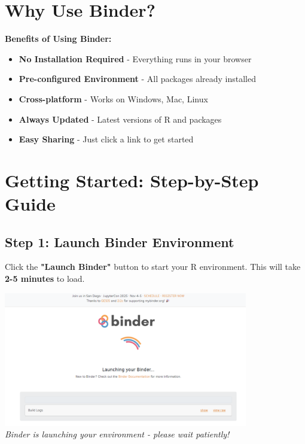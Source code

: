 \documentclass[11pt,a4paper]{article}
\begin{document}
\section{Why Use Binder?}

\begin{infobox}
\textbf{Benefits of Using Binder:}
\begin{itemize}[leftmargin=*]
    \item \textbf{No Installation Required} - Everything runs in your browser
    \item \textbf{Pre-configured Environment} - All packages already installed
    \item \textbf{Cross-platform} - Works on Windows, Mac, Linux
    \item \textbf{Always Updated} - Latest versions of R and packages
    \item \textbf{Easy Sharing} - Just click a link to get started
\end{itemize}
\end{infobox}

\section{Getting Started: Step-by-Step Guide}

\subsection{Step 1: Launch Binder Environment}

Click the \textbf{"Launch Binder"} button to start your R environment. This will take \textbf{2-5 minutes} to load.

\begin{center}
\includegraphics[width=0.8\textwidth]{../Image_1.png}\\
\textit{Binder is launching your environment - please wait patiently!}
\end{center}
\end{document}
